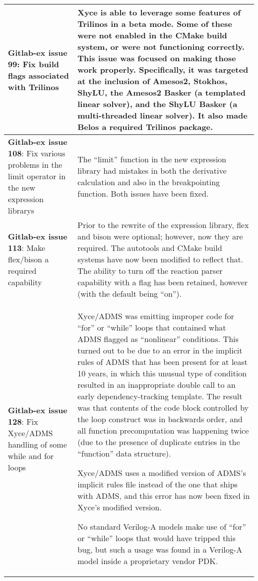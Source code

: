 {\begin{longtable}[h] {>{\raggedright\small}m{2in}|>{\raggedright\let\\\tabularnewline\small}m{3.5in}}
\textbf{Gitlab-ex issue 99}:  Fix build flags associated with Trilinos &
Xyce is able to leverage some features of Trilinos in a beta mode. Some of
these were not enabled in the CMake build system, or were not functioning
correctly. This issue was focused on making those work properly. Specifically,
it was targeted at the inclusion of Amesos2, Stokhos, ShyLU, the Amesos2 Basker
(a templated linear solver), and the ShyLU Basker (a multi-threaded linear
solver). It also made Belos a required Trilinos package.
\\ \hline

\textbf{Gitlab-ex issue 108}:  Fix various problems in the limit operator in 
the new expression librarys &
The ``limit'' function in the new expression library had mistakes in both the 
derivative calculation and also in the breakpointing function.  Both issues 
have been fixed.
\\ \hline

\textbf{Gitlab-ex issue 113}:  Make flex/bison a required capability &
Prior to the rewrite of the expression library, flex and bison were optional;
however, now they are required. The autotools and CMake build systems have now
been modified to reflect that. The ability to turn off the reaction parser
capability with a flag has been retained, however (with the default being
``on'').
\\ \hline

\textbf{Gitlab-ex issue 128}: Fix Xyce/ADMS handling of some while and for loops &
Xyce/ADMS was emitting improper code for ``for'' or ``while'' loops
that contained what ADMS flagged as ``nonlinear'' conditions.  This
turned out to be due to an error in the implicit rules of ADMS that
has been present for at least 10 years, in which this unusual type of
condition resulted in an inappropriate double call to an early
dependency-tracking template.  The result was that contents of the
code block controlled by the loop construct was in backwards order,
and all function precomputation was happening twice (due to the
presence of duplicate entries in the ``function'' data structure).

Xyce/ADMS uses a modified version of ADMS's implicit rules file
instead of the one that ships with ADMS, and this error has now been
fixed in Xyce's modified version.

No standard Verilog-A models make use of ``for'' or ``while'' loops
that would have tripped this bug, but such a usage was found in a
Verilog-A model inside a proprietary vendor PDK. \\ \hline


\end{longtable}}
